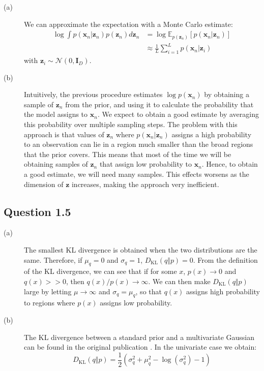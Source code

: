 \documentclass{article}
\begin{document}
\begin{description}
\item[(a)] We can approximate the expectation with a Monte Carlo estimate:
\begin{align*}
\log\int p(\mathbf{x}_n\vert\mathbf{z}_n)p(\mathbf{z}_n)d\mathbf{z}_n &= \log\mathbb{E}_{p(\mathbf{z}_n)}[p(\mathbf{x}_n\vert\mathbf{z}_n)] \\
&\approx \frac{1}{L}\sum_{i=1}^{L} p(\mathbf{x}_n\vert\mathbf{z}_i)
\end{align*}
with $\mathbf{z}_i\sim\mathcal{N}(0, \mathbf{I}_D)$.

\item[(b)] Intuitively, the previous procedure estimates $\log p(\mathbf{x}_n)$ by obtaining a sample of $\mathbf{z}_n$ from the prior, and using it to calculate the probability that the model assigns to $\mathbf{x}_n$. We expect to obtain a good estimate by averaging this probability over multiple sampling steps. The problem with this approach is that values of $\mathbf{z}_n$ where $p(\mathbf{x}_n\vert\mathbf{z}_n)$ assigns a high probability to an observation can lie in a region much smaller than the broad regions that the prior covers. This means that most of the time we will be obtaining samples of $\mathbf{z}_n$ that assign low probability to $\mathbf{x}_n$. Hence, to obtain a good estimate, we will need many samples. This effects worsens as the dimension of $\mathbf{z}$ increases, making the approach very inefficient.
\end{description}

\subsection*{Question 1.5}

\begin{description}
\item[(a)] The smallest KL divergence is obtained when the two distributions are the same. Therefore, if $\mu_q = 0$ and $\sigma_q=1$, $D_{\text{KL}}(q\Vert p) = 0$.
From the definition of the KL divergence, we can see that if for some $x$, $p(x)\rightarrow 0$ and $q(x)>>0$, then $q(x)/p(x)\rightarrow\infty$. We can then make $D_{\text{KL}}(q\Vert p)$ large by letting $\mu\rightarrow\infty$ and $\sigma_q = \mu_q$, so that $q(x)$ assigns high probability to regions where $p(x)$ assigns low probability.

\item[(b)] The KL divergence between a standard prior and a multivariate Gaussian can be found in the original publication \cite{kingma2014vae}. In the univariate case we obtain:
\begin{equation*}
D_{\text{KL}}(q\Vert p) = \frac{1}{2}(\sigma_q^2 + \mu_q^2 - \log(\sigma_q^2) - 1)
\end{equation*}
\end{description}
\end{document}
